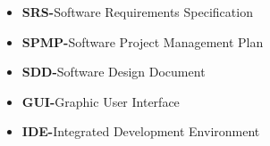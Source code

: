 \begin{itemize}
	\item \textbf{SRS-}Software Requirements Specification
	\item \textbf{SPMP-}Software Project Management Plan
	\item \textbf{SDD-}Software Design Document
	\item \textbf{GUI-}Graphic User Interface
	\item \textbf{IDE-}Integrated Development Environment
\end{itemize}
	